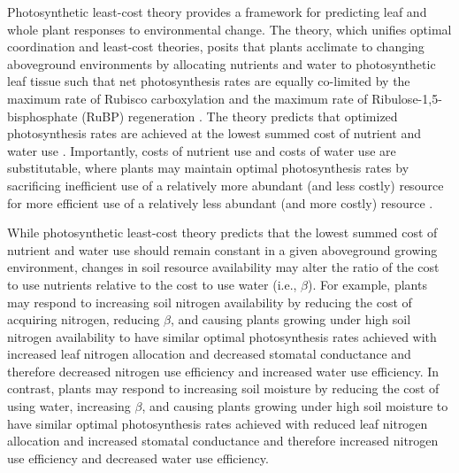 Photosynthetic least-cost theory  provides a framework for predicting leaf and whole plant responses to environmental change. The theory, which unifies optimal coordination  and least-cost  theories, posits that plants acclimate to changing aboveground environments by allocating nutrients and water to photosynthetic leaf tissue such that net photosynthesis rates are equally co-limited by the maximum rate of Rubisco carboxylation and the maximum rate of Ribulose-1,5-bisphosphate (RuBP) regeneration . The theory predicts that optimized photosynthesis rates are achieved at the lowest summed cost of nutrient and water use . Importantly, costs of nutrient use and costs of water use are substitutable, where plants may maintain optimal photosynthesis rates by sacrificing inefficient use of a relatively more abundant (and less costly) resource for more efficient use of a relatively less abundant (and more costly) resource .

While photosynthetic least-cost theory predicts that the lowest summed cost of nutrient and water use should remain constant in a given aboveground growing environment, changes in soil resource availability may alter the ratio of the cost to use nutrients relative to the cost to use water (i.e., $\beta$). For example, plants may respond to increasing soil nitrogen availability by reducing the cost of acquiring nitrogen, reducing $\beta$, and causing plants growing under high soil nitrogen availability to have similar optimal photosynthesis rates achieved with increased leaf nitrogen allocation and decreased stomatal conductance and therefore decreased nitrogen use efficiency and increased water use efficiency. In contrast, plants may respond to increasing soil moisture by reducing the cost of using water, increasing $\beta$, and causing plants growing under high soil moisture to have similar optimal photosynthesis rates achieved with reduced leaf nitrogen allocation and increased stomatal conductance and therefore increased nitrogen use efficiency and decreased water use efficiency.

